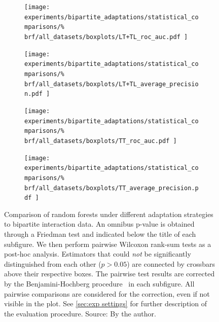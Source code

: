 \begin{figure}[tb]
    \centering
    \begin{subfigure}{0.49\textwidth}
        \texttt{[image: 
            experiments/bipartite\_adaptations/statistical\_comparisons/\%
            brf/all\_datasets/boxplots/LT+TL\_roc\_auc.pdf
        ]}
    \end{subfigure}
    \begin{subfigure}{0.49\textwidth}
        \texttt{[image: 
            experiments/bipartite\_adaptations/statistical\_comparisons/\%
            brf/all\_datasets/boxplots/LT+TL\_average\_precision.pdf
        ]}
    \end{subfigure}

    \begin{subfigure}{0.49\textwidth}
        \texttt{[image: 
            experiments/bipartite\_adaptations/statistical\_comparisons/\%
            brf/all\_datasets/boxplots/TT\_roc\_auc.pdf
        ]}
    \end{subfigure}
    \begin{subfigure}{0.49\textwidth}
        \texttt{[image: 
            experiments/bipartite\_adaptations/statistical\_comparisons/\%
            brf/all\_datasets/boxplots/TT\_average\_precision.pdf
        ]}
    \end{subfigure}
    \caption{
        Comparison of random forests under different adaptation strategies to bipartite interaction data.
        An omnibus p-value is obtained through a Friedman test and indicated below the title of each subfigure.
        We then perform pairwise Wilcoxon rank-sum tests as a post-hoc analysis.
        Estimators that could \emph{not} be significantly distinguished from each other ($p > 0.05$) are connected by crossbars above their respective boxes. 
        The pairwise test results are corrected by the Benjamini-Hochberg procedure~\cite{benjamini1995controlling,haynes2013benjamini} in each subfigure. All pairwise comparisons are considered for the correction, even if not visible in the plot.
        See \autoref{sec:exp settings} for further description of the evaluation procedure. \newline Source: By the author.
    }
    \label{fig:adaptations_brf}
\end{figure}


